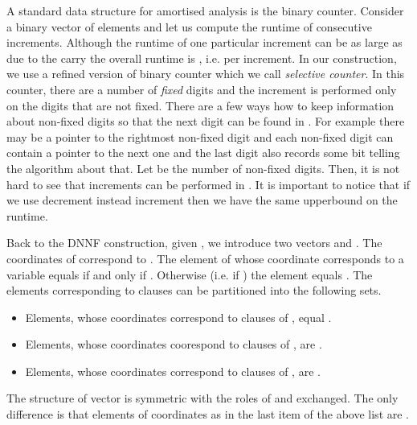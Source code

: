 \documentclass{llncs}
\begin{document}
A standard data structure for amortised analysis is the binary counter. Consider a binary vector of  elements
and let us compute the runtime of  consecutive increments. Although the runtime of one particular increment
can be as large as  due to the carry the overall runtime is , i.e.  per increment.
In our construction, we use a refined version of binary counter which we call \emph{selective counter}.
In this counter, there are a number of \emph{fixed} digits and the increment is performed only on the digits
that are not fixed. There are a few ways how to keep information about non-fixed digits so that the next digit
can be found in . For example there may be a pointer to the rightmost non-fixed digit and each non-fixed
digit can contain a pointer to the next one and the last digit also records some bit telling the algorithm about
that.  Let  be the number of non-fixed digits. Then, it is not hard to see that  increments can
be performed in . It is important to notice that if we use decrement instead increment then we have
the same upperbound on the runtime.

Back to the DNNF construction, given , we introduce two vectors  and . The coordinates of 
correspond to . The element of  whose coordinate 
corresponds to a variable  equals  if and only if . Otherwise (i.e. if ) the element 
equals . The elements corresponding to clauses can be partitioned into the following  sets.
\begin{itemize}
\item Elements, whose coordinates correspond to clauses of , equal . 
\item Elements, whose coordinates coorespond to clauses of , are .
\item Elements, whose coordinates correspond to clauses of , are .
\end{itemize}

The structure of vector  is symmetric with the roles of  and  exchanged. The only difference is
that elements of coordinates as in the last item of the above list are . 
\end{document}
